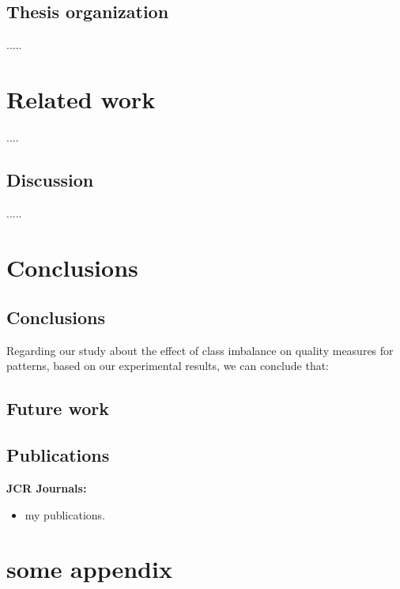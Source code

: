 \documentclass[letterpaper, twoside, openright, 12pt]{book}%
\begin{document}
\section{Thesis organization}
.....

\newpage 
\chapter{Related work} \label{chap:RelatedWork} 
....

\section{Discussion} \label{sec:RW_Discussion}
.....


\chapter{Conclusions} \label{chap:Conclusions}


\section{Conclusions} \label{sec:Conclusions}

Regarding our study about the effect of class imbalance on quality measures for patterns, based on our experimental results, we can conclude that:


\section{Future work} \label{sec:Futurework}

\section{Publications} \label{sec:Publications}


\singlespace 

\textbf{JCR Journals:}

\begin{itemize}
\item my publications. 
\end{itemize}

\singlespace
\small
{}



\pagestyle{fancy}
\normalsize
\appendix
{}

\chapter{some appendix} \label{app:StatisticalTests}



\end{document}
